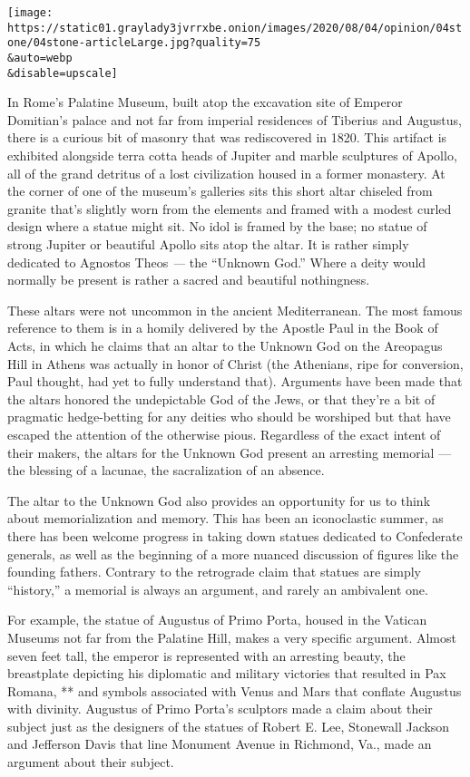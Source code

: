 \texttt{[image: https://static01.graylady3jvrrxbe.onion/images/2020/08/04/opinion/04stone/04stone-articleLarge.jpg?quality=75\\\&auto=webp\\\&disable=upscale]}

In Rome's Palatine Museum, built atop the excavation site of Emperor
Domitian's palace and not far from imperial residences of Tiberius and
Augustus, there is a curious bit of masonry that was rediscovered in
1820. This artifact is exhibited alongside terra cotta heads of Jupiter
and marble sculptures of Apollo, all of the grand detritus of a lost
civilization housed in a former monastery. At the corner of one of the
museum's galleries sits this short altar chiseled from granite that's
slightly worn from the elements and framed with a modest curled design
where a statue might sit. No idol is framed by the base; no statue of
strong Jupiter or beautiful Apollo sits atop the altar. It is rather
simply dedicated to Agnostos Theos \emph{---} the ``Unknown God.'' Where
a deity would normally be present is rather a sacred and beautiful
nothingness.

These altars were not uncommon in the ancient Mediterranean. The most
famous reference to them is in a homily delivered by the Apostle Paul in
the Book of Acts, in which he claims that an altar to the Unknown God on
the Areopagus Hill in Athens was actually in honor of Christ (the
Athenians, ripe for conversion, Paul thought, had yet to fully
understand that). Arguments have been made that the altars honored the
undepictable God of the Jews, or that they're a bit of pragmatic
hedge-betting for any deities who should be worshiped but that have
escaped the attention of the otherwise pious. Regardless of the exact
intent of their makers, the altars for the Unknown God present an
arresting memorial --- the blessing of a lacunae, the sacralization of
an absence.

The altar to the Unknown God also provides an opportunity for us to
think about memorialization and memory. This has been an iconoclastic
summer, as there has been welcome progress in taking down statues
dedicated to Confederate generals, as well as the beginning of a more
nuanced discussion of figures like the founding fathers. Contrary to the
retrograde claim that statues are simply ``history,'' a memorial is
always an argument, and rarely an ambivalent one.

For example, the statue of Augustus of Primo Porta, housed in the
Vatican Museums not far from the Palatine Hill, makes a very specific
argument. Almost seven feet tall, the emperor is represented with an
arresting beauty, the breastplate depicting his diplomatic and military
victories that resulted in Pax Romana, ** and symbols associated with
Venus and Mars that conflate Augustus with divinity. Augustus of Primo
Porta's sculptors made a claim about their subject just as the designers
of the statues of Robert E. Lee, Stonewall Jackson and Jefferson Davis
that line Monument Avenue in Richmond, Va., made an argument about their
subject.

